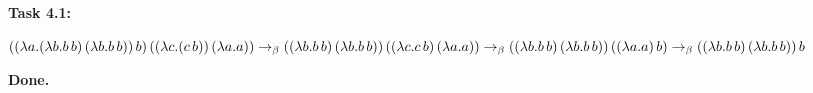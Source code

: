 \documentclass[12pt]{article}
\begin{document}
	
	\Large 
	\begin{center}
		\textbf{Task 4.1:}
	\end{center}

	$\\*((\lambda a.(\lambda b.b\,b)\,(\lambda b.b\,b))\,b)\,((\lambda c.(c\,b))\,(\lambda a.a)) \to_\beta
	\\*((\lambda b.b\,b)\,(\lambda b.b\,b))\,((\lambda c.c\,b)\,(\lambda a.a)) \to_\beta
	\\*((\lambda b.b\,b)\,(\lambda b.b\,b))\,((\lambda a.a)\,b) \to_\beta 
	\\*((\lambda b.b\,b)\,(\lambda b.b\,b))\,b$
	
	\begin{flushleft}
		\textbf{Done.}
	\end{flushleft}
	
\end{document}

